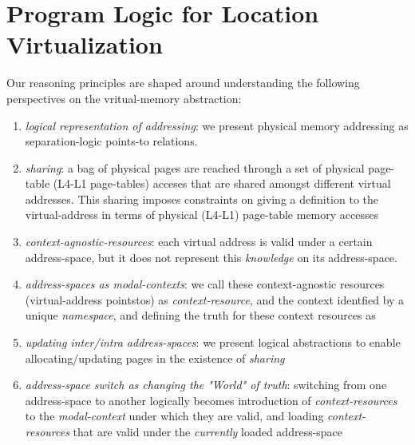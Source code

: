 \section{Program Logic for Location Virtualization}
\label{sec:logic}
\newcommand{\gammaPred}{\delta}
\newcommand{\gammaPreds}{\delta\textsf{s}}
\newcommand{\rtv}{\textsf{rtv}}

\newcommand{\sumwalkabs}[3]{
  \ownGhost\gammaPred{\authfrag{\singletonMap{#1}{(#2, #3)}}}
}

\newcommand{\sumapaces}[2]{
  \ownGhost\gammaPreds{\authfrag{\singletonMap{#1}{#2}}}
}
\newcommand{\ptableabswalk}[1]{\mathcal{A}\textsf{bsPTableWalk}(#1)}
\newcommand{\ptablestore}{\theta}
Our reasoning principles are shaped around understanding the following perspectives on the vritual-memory abstraction:
\begin{enumerate}
\item \textit{logical representation of addressing}: we present physical memory addressing as separation-logic points-to relations.
\item \textit{sharing}: a bag of physical pages are reached through a set of physical page-table (L4-L1 page-tables) acceses that are shared amongst different virtual addresses. This sharing imposes constraints on giving a definition to the virtual-address in terms of physical (L4-L1) page-table memory accesses
\item \textit{context-agnostic-resources}: each virtual address is valid under a certain address-space, but it does not represent this \textit{knowledge} on its address-space. 
\item \textit{address-spaces as modal-contexts}: we call these context-agnostic resources (virtual-address pointstos) as \textit{context-resource}, and the context identfied by a unique \textit{namespace}, and  defining the truth for these context resources as 
\item \textit{updating inter/intra address-spaces}: we present logical abstractions to enable allocating/updating pages in the existence of \textit{sharing}  
\item \textit{address-space switch as changing the "World" of truth}: switching from one address-space to another logically becomes introduction of \textit{context-resources} to the \textit{modal-context} under which they are valid, and loading \textit{context-resources} that are valid under the \textit{currently} loaded address-space
\end{enumerate}
